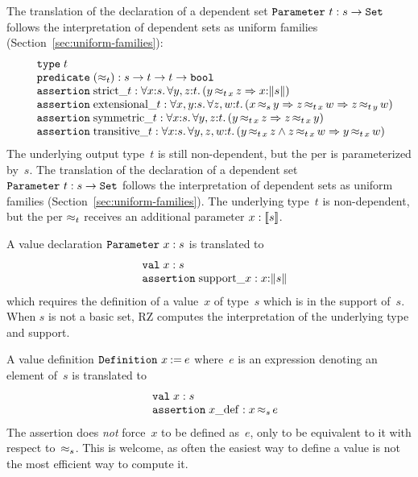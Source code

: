 \iflong
The translation of the declaration of a dependent set
$\iParameter{t}{s \to \iSet}$ follows the interpretation of dependent
sets as uniform families (Section~\ref{sec:uniform-families}):
%
\[
\begin{array}{ll}  
  & \otyspec{t} \\
  & \opropspec{({\approx_{t}})}{\oarrow{s}{\oarrow{t}{\oarrow{t}{\oProp}}}}\\
  & \oassertion{\mathrm{strict}\_{t}}{
    \oforall{x}{s}{
      \oforall{y,z}{t}{
        (\oimply{\oper{\oapp{t}{x}}{y}{z}}{\ototal{x}{s}})
      }
    }
  } \\
  & \oassertion{\mathrm{extensional}\_{t}}{
    \oforall{x,y}{s}{
      \oforall{z,w}{t}{
        (\oimply{\oper{s}{x}{y}}{
          \oimply{\oper{\oapp{t}{x}}{z}{w}}{\oper{\oapp{t}{y}}{z}{w}}
        })
      }
    }
  } \\
  & \oassertion{\mathrm{symmetric}\_{t}}{
    \oforall{x}{s}{
      \oforall{y,z}{t}{(\oimply{\oper{\oapp{t}{x}}{y}{z}}{\oper{\oapp{t}{x}}{z}{y}})}
    }
  }
  \\
  & \oassertion{\mathrm{transitive}\_{t}}{
    \oforall{x}{s}{
      \oforall{y,z,w}{t}{(
        \oimply{
          \oper{\oapp{t}{x}}{y}{z} \land \oper{\oapp{t}{x}}{z}{w}
        }{\oper{\oapp{t}{x}}{y}{w}}
        )}
    }
  }
\end{array}
\]
%
The underlying output type~$t$ is still non-dependent, but the per is
parameterized by~$s$.
\else %
The translation of the declaration of a dependent set
$\iParameter{t}{s \to \iSet}$ follows the interpretation of dependent
sets as uniform families (Section~\ref{sec:uniform-families}). The
underlying type~$t$ is non-dependent, but the per $\per_t$ receives an
additional parameter $x : \values{s}$.
\fi %

A value declaration $\iParameter{x}{s}$ is translated to
%
\[
\begin{array}{ll}
  & \ovalspec{x}{s} \\
  & \oassertion{\mathrm{support}\_x}{\ototal{x}{s}}
\end{array}
\]
%
which requires the definition of a value~$x$ of type~$s$ which is in
the support of~$s$. When $s$ is not a basic set, RZ computes the
interpretation of the underlying type and support.

A value definition $\iDefinition{x}{e}$ where~$e$ is an expression
denoting an element of~$s$ is translated to
%
\[
\begin{array}{ll}
  & \ovalspec{x}{s} \\
  & \oassertion{x\_\mathrm{def}}{\oper{s}{x}{e}}
\end{array}
\]
%
The assertion does \emph{not} force~$x$ to be defined as~$e$, only to
be equivalent to it with respect to~$\per_s$. This is welcome, as
often the easiest way to define a value is not the most efficient
way to compute it.

